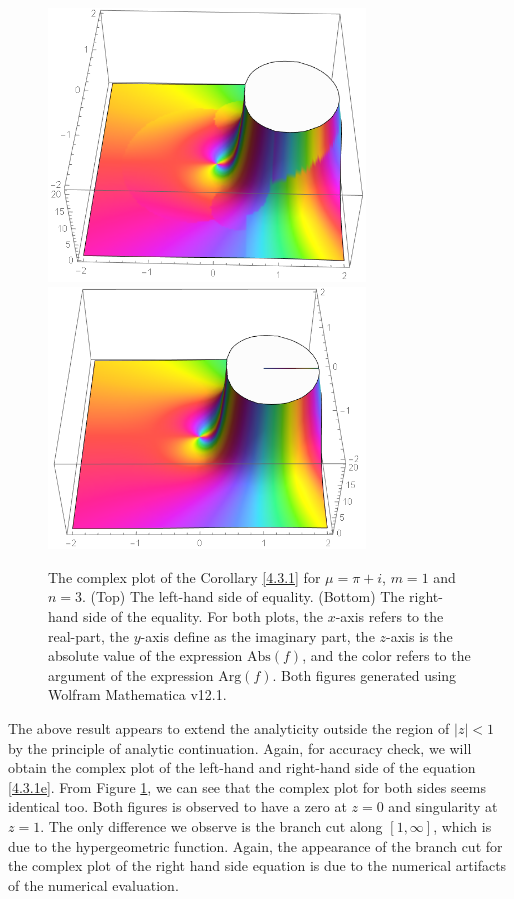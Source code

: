 \begin{figure}[t]
 	\centering
 	\includegraphics[width=0.75\textwidth]{4.3LHS.png}
 	 	\includegraphics[width=0.75\textwidth]{4.3RHS.png}
 	\caption{The complex plot of the Corollary \ref{4.3.1} for $\mu = \pi + i$, $m=1$ and $n=3$. (Top) The left-hand side of equality. (Bottom) The right-hand side of the equality. For both plots, the $x$-axis refers to the real-part, the $y$-axis define as the imaginary part, the $z$-axis is the absolute value of the expression $\mathrm{Abs}(f)$, and the color refers to the argument of the expression $\mathrm{Arg}(f)$. Both figures generated using Wolfram Mathematica v12.1.}
 	\label{F4.3.1}
 \end{figure}

The above result appears to extend the analyticity outside the region of $|z| < 1$ by the principle of analytic continuation. Again, for accuracy check, we will obtain the complex plot of the left-hand and right-hand side of the equation \eqref{4.3.1e}. From Figure \ref{F4.3.1}, we can see that the complex plot for both sides seems identical too. Both figures is observed to have a zero at $z=0$ and singularity at $z=1$. The only difference we observe is the branch cut along $[1, \infty]$, which is due to the hypergeometric function. Again, the appearance of the branch cut for the complex plot of the right hand side equation is due to the numerical artifacts of the numerical evaluation. 


